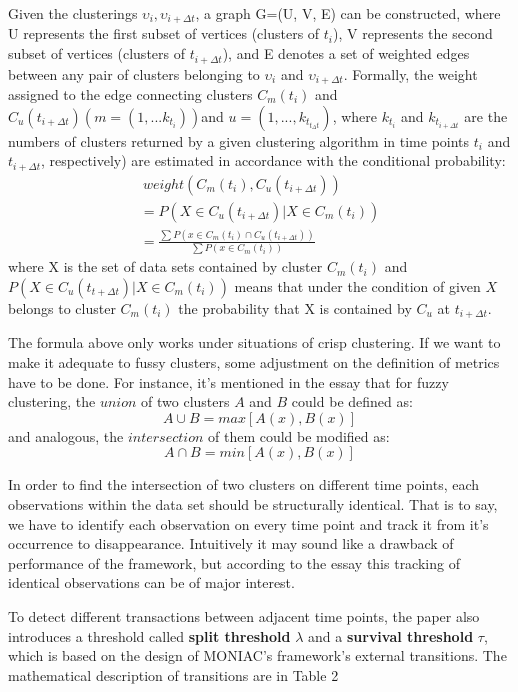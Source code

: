 \documentclass{sig-alternate-05-2015}
\begin{document}
Given the clusterings $\upsilon_i, \upsilon_{i+\Delta t}$, a graph G=(U, V, E) can be constructed, where U represents the first subset of vertices (clusters of $t_i$), V represents the second subset of vertices (clusters of $t_{i+\Delta t}$), and E denotes a set of weighted edges between any pair of clusters belonging to $\upsilon_i$ and $\upsilon_{i+\Delta t}$. Formally, the weight assigned to the edge connecting clusters $C_m(t_i)$ and $C_u(t_{i+\Delta t})(m = (1,...k_{t_i}))$and $u = (1,...,k_{t_{t_\Delta t}})$, where $k_{t_i}$ and $k_{t_{i+\Delta t}}$ are the numbers of clusters returned by a given clustering algorithm in time points $t_i$ and $t_{i+\Delta t}$, respectively) are estimated in accordance with the conditional probability:
\begin{gather*}\
  weight(C_m(t_i), C_u(t_{i+\Delta t})) \\
   = P(X\in C_u(t_{i+\Delta t})|X\in C_m(t_i)) \\
   = \frac{\sum P(x\in C_m(t_i)\cap C_u(t_{i+\Delta t}))}{\sum P(x\in C_m(t_i))}
\end{gather*}
where X is the set of data sets contained by cluster $C_m(t_i)$ and $P(X\in C_u(t_{t+\Delta t})|X\in C_m(t_i))$ means that under the condition of given $X$ belongs to cluster $C_m(t_i)$ the probability that X is contained by $C_u$ at $t_{i+\Delta t}$.

The formula above only works under situations of crisp clustering. If we want to make it adequate to fussy clusters, some adjustment on the definition of metrics have to be done. For instance, it's mentioned in the essay that for fuzzy clustering, the $union$ of two clusters $A$ and $B$ could be defined as:
\begin{displaymath}
  A\cup B=max[A(x), B(x)]
\end{displaymath}
and analogous, the $intersection$ of them could be modified as:
\begin{displaymath}
  A\cap B=min[A(x),B(x)]
\end{displaymath}

In order to find the intersection of two clusters on different time points, each observations within the data set should be structurally identical. That is to say, we have to identify each observation on every time point and track it from it's occurrence to disappearance. Intuitively it may sound like a drawback of performance of the framework, but according to the essay this tracking of identical observations can be of major interest.

To detect different transactions between adjacent time points, the paper also introduces a threshold called \textbf{split threshold} $\lambda$ and a \textbf{survival threshold} $\tau$, which is based on the design of MONIAC's framework's external transitions\cite{SPILIOPOULOU:transition}. The mathematical description of transitions are in Table 2
\end{document}
